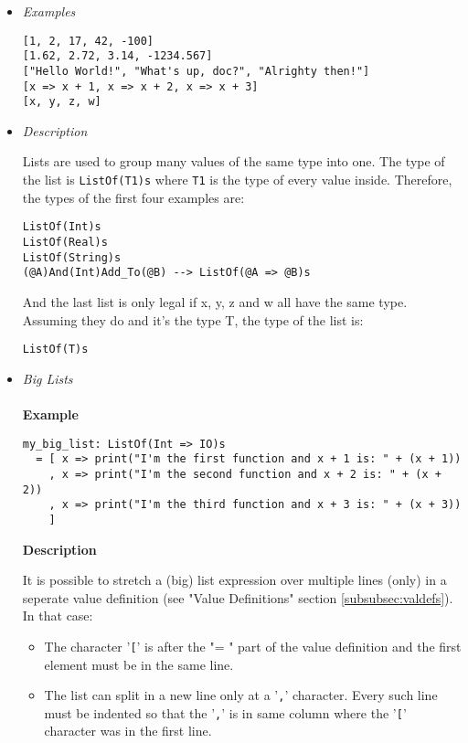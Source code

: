 \documentclass{article}
\begin{document}
\begin{itemize}

\item \textit{Examples}
\begin{verbatim}
[1, 2, 17, 42, -100]
[1.62, 2.72, 3.14, -1234.567]
["Hello World!", "What's up, doc?", "Alrighty then!"]
[x => x + 1, x => x + 2, x => x + 3]
[x, y, z, w]
\end{verbatim}

\item \textit{Description}

Lists are used to group many values of the same type into one.  The type of the
list is \verb|ListOf(T1)s| where \verb|T1| is the type of every value inside.
Therefore, the types of the first four examples are:
\begin{verbatim}
ListOf(Int)s
ListOf(Real)s
ListOf(String)s
(@A)And(Int)Add_To(@B) --> ListOf(@A => @B)s
\end{verbatim}
And the last list is only legal if x, y, z and w all have the same type.
Assuming they do and it's the type T, the type of the list is: 
\begin{verbatim}
ListOf(T)s
\end{verbatim}

\newpage
\item \textit{Big Lists}
  \\\\
  \textbf{Example}

  \begin{verbatim}
my_big_list: ListOf(Int => IO)s
  = [ x => print("I'm the first function and x + 1 is: " + (x + 1))
    , x => print("I'm the second function and x + 2 is: " + (x + 2))
    , x => print("I'm the third function and x + 3 is: " + (x + 3))
    ]
  \end{verbatim}

  \textbf{Description} 

  It is possible to stretch a (big) list expression over multiple lines (only)
  in a seperate value definition (see "Value Definitions" section
  \ref{subsubsec:valdefs}).  In that case:
  \begin{itemize}
  \item
  The character '\verb|[|' is after the "= " part of the value definition
  and the first element must be in the same line.

  \item
  The list can split in a new line only at a '\verb|,|' character. Every such
  line must be indented so that the '\verb|,|' is in same column where the
  '\verb|[|' character was in the first line.


\end{itemize}
\end{itemize}
\end{document}
